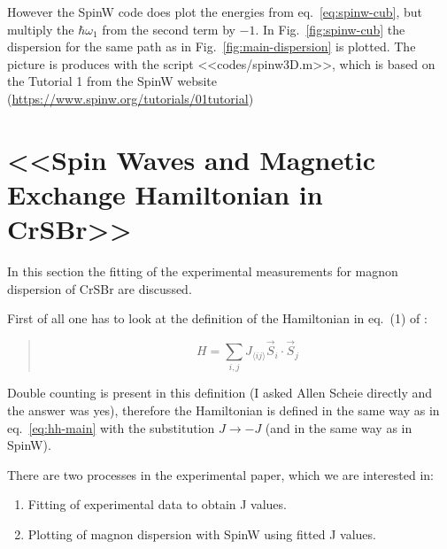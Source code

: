 \documentclass[a4paper,12pt]{article}
\begin{document}
        However the SpinW code does plot the energies from eq.~\eqref{eq:spinw-cub}, but multiply the $\hbar\omega_1$ from the second term by $-1$. 
        In Fig.~\ref{fig:spinw-cub} the dispersion for the same path as in Fig.~\ref{fig:main-dispersion} is plotted. 
        The picture is produces with the script <<codes/spinw3D.m>>, which is based on the Tutorial 1 from the SpinW website (\url{https://www.spinw.org/tutorials/01tutorial})


    \section{<<Spin Waves and Magnetic Exchange Hamiltonian in CrSBr>>\cite{scheie2022spin}}
        In this section the fitting of the experimental measurements for magnon dispersion of CrSBr are discussed.

        First of all one has to look at the definition of the Hamiltonian in eq.~(1) of \cite{scheie2022spin}:
        \begin{quote}
            \begin{equation}
                H = \sum_{i,j} J_{\langle ij \rangle} \vec{S}_i \cdot \vec{S}_j
                \label{eq:exp-ham}
            \end{equation}
        \end{quote}

        Double counting is present in this definition (I asked Allen Scheie directly and the answer was yes), 
        therefore the Hamiltonian is defined in the same way as in eq.~\eqref{eq:hh-main} 
        with the substitution $J \rightarrow -J$ (and in the same way as in SpinW). 

        There are two processes in the experimental paper, which we are interested in: 
        \begin{enumerate}
            \item Fitting of experimental data to obtain J values.
            \item Plotting of magnon dispersion with SpinW using fitted J values.
        \end{enumerate}
        
\end{document}
